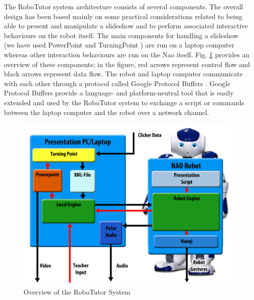 
The RoboTutor system architecture consists of several components. The overall design has been based mainly on some practical considerations related to being able to present and manipulate a slideshow and to perform associated interactive behaviours on the robot itself.  The main components for handling a slideshow (we have used PowerPoint \cite{PowerPoint} and TurningPoint \cite{TurningPoint}) are run on a laptop computer whereas other interaction behaviours are run on the Nao itself. Fig. \ref{fig:system_overview} provides an overview of these components; in the figure, red arrows represent control flow and black arrows represent data flow. The robot and laptop computer communicate with each other through a protocol called Google Protocol Buffers \cite{protobuf}. Google Protocol Buffers provide a language- and platform-neutral tool that is easily extended and used by the RoboTutor system to exchange a script or commands between the laptop computer and the robot over a network channel.

\begin{figure}
\centering
	\includegraphics[scale=0.07]{images/system_overview.png}
	\caption{Overview of the RoboTutor System}\label{fig:system_overview}
\end{figure}

%
